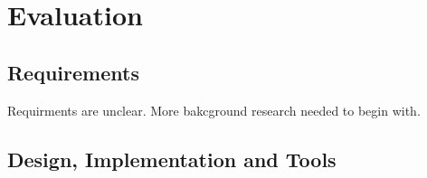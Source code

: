 \chapter{Evaluation}
\begin{comment}

Examiners expect to find a section addressing questions such as:

\begin{itemize}
   \item Were the requirements correctly identified? 
   \item Were the design decisions correct?
   \item Could a more suitable set of tools have been chosen?
   \item How well did the software meet the needs of those who were expecting to use it?
   \item How well were any other project aims achieved?
   \item If you were starting again, what would you do differently?
\end{itemize}

Other questions can be addressed as appropriate for a project. 

Such material is regarded as an important part of your work; it should demonstrate that you are capable not only of carrying out a piece of work but also of thinking critically about how you did it and how you might have done it better. This is seen as an important part of an honours degree. 

There will be good things and room for improvement with any project. As you write this section, identify and discuss the parts of the work that went well and also consider ways in which the work could be improved. 

In the latter stages of the module, we will discuss the evaluation. That will probably be around week 9, although that differs each year. 
\end{comment}
\section{Requirements}

Requirments are unclear. More bakcground research needed to begin with.


\section{Design, Implementation and Tools}

